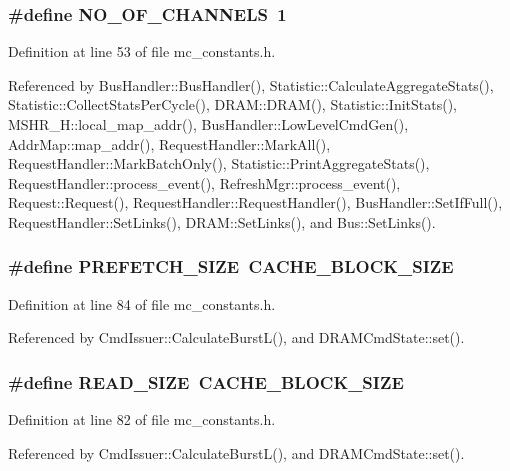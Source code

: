 \subsubsection[{NO\_\-OF\_\-CHANNELS}]{\setlength{\rightskip}{0pt plus 5cm}\#define {\bf NO\_\-OF\_\-CHANNELS}~1}\label{mc__constants_8h_c60f68d55e472737b2890684e0d41ab9}




Definition at line 53 of file mc\_\-constants.h.

Referenced by BusHandler::BusHandler(), Statistic::CalculateAggregateStats(), Statistic::CollectStatsPerCycle(), DRAM::DRAM(), Statistic::InitStats(), MSHR\_\-H::local\_\-map\_\-addr(), BusHandler::LowLevelCmdGen(), AddrMap::map\_\-addr(), RequestHandler::MarkAll(), RequestHandler::MarkBatchOnly(), Statistic::PrintAggregateStats(), RequestHandler::process\_\-event(), RefreshMgr::process\_\-event(), Request::Request(), RequestHandler::RequestHandler(), BusHandler::SetIfFull(), RequestHandler::SetLinks(), DRAM::SetLinks(), and Bus::SetLinks().
\subsubsection[{PREFETCH\_\-SIZE}]{\setlength{\rightskip}{0pt plus 5cm}\#define {\bf PREFETCH\_\-SIZE}~{\bf CACHE\_\-BLOCK\_\-SIZE}}\label{mc__constants_8h_9c2cf5515858ee2f97a157ca23de784f}




Definition at line 84 of file mc\_\-constants.h.

Referenced by CmdIssuer::CalculateBurstL(), and DRAMCmdState::set().
\subsubsection[{READ\_\-SIZE}]{\setlength{\rightskip}{0pt plus 5cm}\#define {\bf READ\_\-SIZE}~{\bf CACHE\_\-BLOCK\_\-SIZE}}\label{mc__constants_8h_86e1969b50e55e5d506233078ca0fa4c}




Definition at line 82 of file mc\_\-constants.h.

Referenced by CmdIssuer::CalculateBurstL(), and DRAMCmdState::set().
